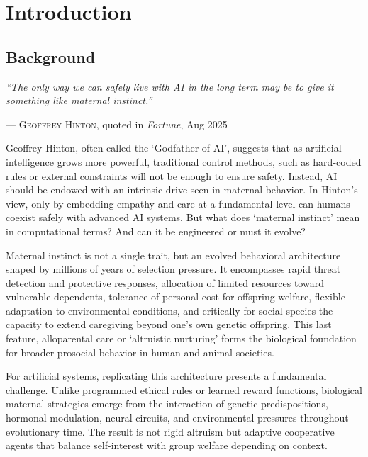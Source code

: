 \newpage
\chapter{Introduction}

\section{Background}
\noindent

\textit{``The only way we can safely live with AI in the long term may be to give it something like maternal instinct.''}
\par\medskip
--- \textsc{Geoffrey Hinton}, quoted in \emph{Fortune}, Aug 2025 \cite{fortune2025} \vspace{10pt}

Geoffrey Hinton, often called the `Godfather of AI', suggests that as artificial intelligence grows more powerful, traditional control methods, such as hard-coded rules or external constraints will not be enough to ensure safety. Instead, AI should be endowed with an intrinsic drive seen in maternal behavior. In Hinton's view, only by embedding empathy and care at a fundamental level can humans coexist safely with advanced AI systems. But what does `maternal instinct' mean in computational terms? And can it be engineered or must it evolve?

Maternal instinct is not a single trait, but an evolved behavioral architecture shaped by millions of years of selection pressure. It encompasses rapid threat detection and protective responses, allocation of limited resources toward vulnerable dependents, tolerance of personal cost for offspring welfare, flexible adaptation to environmental conditions, and critically for social species the capacity to extend caregiving beyond one's own genetic offspring. This last feature, alloparental care or `altruistic nurturing' forms the biological foundation for broader prosocial behavior in human and animal societies.

For artificial systems, replicating this architecture presents a fundamental challenge. Unlike programmed ethical rules or learned reward functions, biological maternal strategies emerge from the interaction of genetic predispositions, hormonal modulation, neural circuits, and environmental pressures throughout evolutionary time. The result is not rigid altruism but adaptive cooperative agents that balance self-interest with group welfare depending on context.

